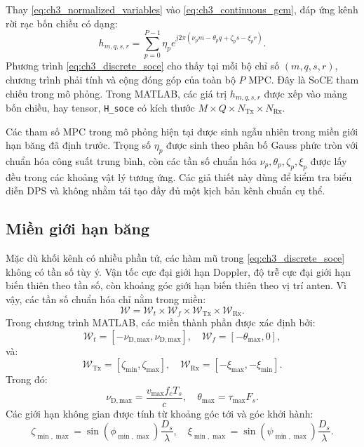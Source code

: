 Thay \eqref{eq:ch3_normalized_variables} vào \eqref{eq:ch3_continuous_gcm}, đáp ứng kênh rời rạc bốn chiều có dạng:
\begin{equation}
h_{m,q,s,r}
=
\sum_{p=0}^{P-1}
\eta_p
e^{j2\pi(\nu_p m-\theta_p q+\zeta_p s-\xi_p r)}.
\label{eq:ch3_discrete_soce}
\end{equation}
Phương trình \eqref{eq:ch3_discrete_soce} cho thấy tại mỗi bộ chỉ số \((m,q,s,r)\), chương trình phải tính và cộng đóng góp của toàn bộ \(P\) MPC. Đây là SoCE tham chiếu trong mô phỏng. Trong MATLAB, các giá trị \(h_{m,q,s,r}\) được xếp vào mảng bốn chiều, hay tensor, \texttt{H\_soce} có kích thước \(M\times Q\times N_{\mathrm{Tx}}\times N_{\mathrm{Rx}}\).

Các tham số MPC trong mô phỏng hiện tại được sinh ngẫu nhiên trong miền giới hạn băng đã định trước. Trọng số \(\eta_p\) được sinh theo phân bố Gauss phức tròn với chuẩn hóa công suất trung bình, còn các tần số chuẩn hóa \(\nu_p,\theta_p,\zeta_p,\xi_p\) được lấy đều trong các khoảng vật lý tương ứng. Các giả thiết này dùng để kiểm tra biểu diễn DPS và không nhằm tái tạo đầy đủ một kịch bản kênh chuẩn cụ thể.

\subsection{Miền giới hạn băng}
\label{subsec:ch3_band_region}

Mặc dù khối kênh có nhiều phần tử, các hàm mũ trong \eqref{eq:ch3_discrete_soce} không có tần số tùy ý. Vận tốc cực đại giới hạn Doppler, độ trễ cực đại giới hạn biến thiên theo tần số, còn khoảng góc giới hạn biến thiên theo vị trí anten. Vì vậy, các tần số chuẩn hóa chỉ nằm trong miền:
\begin{equation}
\mathcal{W}
=
\mathcal{W}_t
\times
\mathcal{W}_f
\times
\mathcal{W}_{\mathrm{Tx}}
\times
\mathcal{W}_{\mathrm{Rx}}.
\label{eq:ch3_band_region}
\end{equation}
Trong chương trình MATLAB, các miền thành phần được xác định bởi:
\begin{equation}
\mathcal{W}_t=[-\nu_{\mathrm{D,max}},\nu_{\mathrm{D,max}}],
\quad
\mathcal{W}_f=[-\theta_{\max},0],
\label{eq:ch3_time_frequency_bands}
\end{equation}
và:
\begin{equation}
\mathcal{W}_{\mathrm{Tx}}=[\zeta_{\min},\zeta_{\max}],
\quad
\mathcal{W}_{\mathrm{Rx}}=[-\xi_{\max},-\xi_{\min}].
\label{eq:ch3_spatial_bands}
\end{equation}
Trong đó:
\begin{equation}
\nu_{\mathrm{D,max}}
=
\frac{v_{\max} f_c T_s}{c},
\quad
\theta_{\max}=\tau_{\max}F_s.
\label{eq:ch3_doppler_delay_bounds}
\end{equation}
Các giới hạn không gian được tính từ khoảng góc tới và góc khởi hành:
\begin{equation}
\zeta_{\min,\max}=\sin(\phi_{\min,\max})\frac{D_s}{\lambda},
\quad
\xi_{\min,\max}=\sin(\psi_{\min,\max})\frac{D_s}{\lambda}.
\label{eq:ch3_spatial_bounds}
\end{equation}

